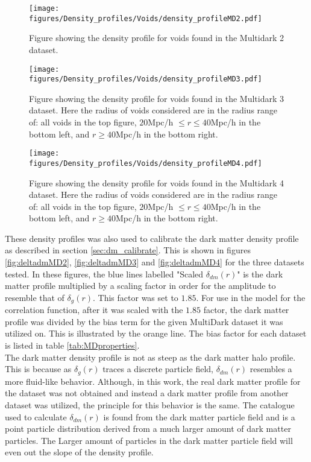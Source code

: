 \begin{figure}[H]
    \texttt{[image: figures/Density\_profiles/Voids/density\_profileMD2.pdf]}
    \caption{Figure showing the density profile for voids found in the Multidark 2 dataset.}
    \label{fig:deltaMD2}
\end{figure}
\begin{figure}[H]
    \texttt{[image: figures/Density\_profiles/Voids/density\_profileMD3.pdf]}
    \caption{Figure showing the density profile for voids found in the Multidark 3 dataset. Here the radius of voids considered are in the radius range of: all voids in the top figure, $20$Mpc/h $\leq r\leq 40$Mpc/h in the bottom left, and $r\geq 40$Mpc/h in the bottom right.}
    \label{fig:deltaMD3}
\end{figure}
\begin{figure}[H]
    \texttt{[image: figures/Density\_profiles/Voids/density\_profileMD4.pdf]}
    \caption{Figure showing the density profile for voids found in the Multidark 4 dataset. Here the radius of voids considered are in the radius range of: all voids in the top figure, $20$Mpc/h $\leq r\leq 40$Mpc/h in the bottom left, and $r\geq 40$Mpc/h in the bottom right.}
    \label{fig:deltaMD4}
\end{figure}
These density profiles was also used to calibrate the dark matter density profile as described in section \ref{sec:dm_calibrate}. This is shown in figures \ref{fig:deltadmMD2}, \ref{fig:deltadmMD3} and \ref{fig:deltadmMD4} for the three datasets tested.
In these figures, the blue lines labelled "Scaled $\delta_{dm}(r)$" is the dark matter profile multiplied by a scaling factor in order for the amplitude to resemble that of $\delta_g(r)$. This factor was set to $1.85$. For use in the model for the correlation function, after it was scaled with the $1.85$ factor, the dark matter profile was divided by the bias term for the given MultiDark dataset it was utilized on. This is illustrated by the orange line. The bias factor for each dataset is listed in table \ref{tab:MDproperties}.\\\indent
The dark matter density profile is not as steep as the dark matter halo profile. This is because as $\delta_g(r)$ traces a discrete particle field, $\delta_{dm}(r)$ resembles a more fluid-like behavior. Although, in this work, the real dark matter profile for the dataset was not obtained and instead a dark matter profile from another dataset was utilized, the principle for this behavior is the same. The catalogue used to calculate $\delta_{dm}(r)$ is found from the dark matter particle field and is a point particle distribution derived from a much larger amount of dark matter particles. The Larger amount of particles in the dark matter particle field will even out the slope of the density profile.\\\indent 
